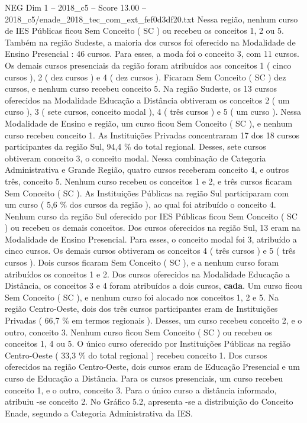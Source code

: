 \begin{textsample}{NEG Dim 1 – 2018\_c5 – Score 13.00 – 2018\_c5/enade\_2018\_tec\_com\_ext\_fef0d3df20.txt}
Nessa região, nenhum curso de IES Públicas ficou Sem Conceito ( SC ) ou recebeu os conceitos 1, 2 ou 5.
Também na região Sudeste, a maioria dos cursos foi oferecido na Modalidade de Ensino Presencial : 46 cursos.
Para esses, a moda foi o conceito 3, com 11 cursos.
Os demais cursos presenciais da região foram atribuídos aos conceitos 1 ( cinco cursos ), 2 ( dez cursos ) e 4 ( dez cursos ).
Ficaram Sem Conceito ( SC ) dez cursos, e nenhum curso recebeu conceito 5.
Na região Sudeste, os 13 cursos oferecidos na Modalidade Educação a Distância obtiveram os conceitos 2 ( um curso ), 3 ( sete cursos, conceito modal ), 4 ( três cursos ) e 5 ( um curso ).
Nessa Modalidade de Ensino e região, um curso ficou Sem Conceito ( SC ), e nenhum curso recebeu conceito 1.
As Instituições Privadas concentraram 17 dos 18 cursos participantes da região Sul, 94,4 \% do total regional.
Desses, sete cursos obtiveram conceito 3, o conceito modal.
Nessa combinação de Categoria Administrativa e Grande Região, quatro cursos receberam conceito 4, e outros três, conceito 5.
Nenhum curso recebeu os conceitos 1 e 2, e três cursos ficaram Sem Conceito ( SC ).
As Instituições Públicas na região Sul participaram com um curso ( 5,6 \% dos cursos da região ), ao qual foi atribuído o conceito 4.
Nenhum curso da região Sul oferecido por IES Públicas ficou Sem Conceito ( SC ) ou recebeu os demais conceitos.
Dos cursos oferecidos na região Sul, 13 eram na Modalidade de Ensino Presencial.
Para esses, o conceito modal foi 3, atribuído a cinco cursos.
Os demais cursos obtiveram os conceitos 4 ( três cursos ) e 5 ( três cursos ).
Dois cursos ficaram Sem Conceito ( SC ), e a nenhum curso foram atribuídos os conceitos 1 e 2.
Dos cursos oferecidos na Modalidade Educação a Distância, os conceitos 3 e 4 foram atribuídos a dois cursos, \textbf{cada}.
Um curso ficou Sem Conceito ( SC ), e nenhum curso foi alocado nos conceitos 1, 2 e 5.
Na região Centro-Oeste, dois dos três cursos participantes eram de Instituições Privadas ( 66,7 \% em termos regionais ).
Desses, um curso recebeu conceito 2, e o outro, conceito 3.
Nenhum curso ficou Sem Conceito ( SC ) ou recebeu os conceitos 1, 4 ou 5.
O único curso oferecido por Instituições Públicas na região Centro-Oeste ( 33,3 \% do total regional ) recebeu conceito 1.
Dos cursos oferecidos na região Centro-Oeste, dois cursos eram de Educação Presencial e um curso de Educação a Distância.
Para os cursos presenciais, um curso recebeu conceito 1, e o outro, conceito 3.
Para o único curso a distância informado, atribuiu -se conceito 2.
No Gráfico 5.2, apresenta -se a distribuição do Conceito Enade, segundo a Categoria Administrativa da IES.

\end{textsample}
